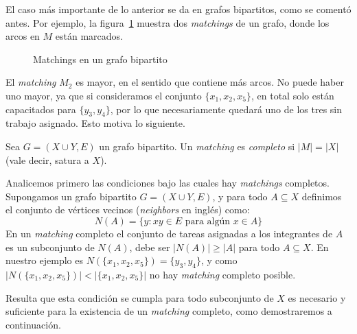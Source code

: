   El caso más importante de lo anterior se da en grafos bipartitos,
  como se comentó antes.%
  Por ejemplo,
  la figura~\ref{fig:matchings}
  muestra dos \emph{\foreignlanguage{english}{matchings}}
  de un grafo,
  donde los arcos en \(M\) están marcados.
  \begin{figure}[htbp]
    \centering
    \hspace*{4em}%
    \caption{Matchings en un grafo bipartito}
    \label{fig:matchings}
  \end{figure}
  El \emph{\foreignlanguage{english}{matching}} \(M_2\) es mayor,
  en el sentido que contiene más arcos.
  No puede haber uno mayor,
  ya que si consideramos el conjunto \(\{x_1, x_2, x_5\}\),
  en total solo están capacitados para \(\{y_3, y_4\}\),
  por lo que necesariamente quedará uno de los tres
  sin trabajo asignado.
  Esto motiva lo siguiente.
  \begin{definition}
    Sea \(G = (X \cup Y, E)\) un grafo bipartito.
    Un \emph{\foreignlanguage{english}{matching}}
    es \emph{completo} si \(\lvert M \rvert = \lvert X \rvert\)
    (vale decir,
     satura a \(X\)).
  \end{definition}

  Analicemos primero las condiciones
  bajo las cuales
  hay \emph{\foreignlanguage{english}{matchings}} completos.
  Supongamos un grafo bipartito \(G = (X \cup Y, E)\),
  y para todo \(A \subseteq X\) definimos
  el conjunto de vértices vecinos
  (\emph{\foreignlanguage{english}{neighbors}} en inglés) como:
  \begin{equation*}
    N(A) = \{y \colon x y \in E \text{\ para algún\ } x \in A\}
  \end{equation*}
  En un \emph{\foreignlanguage{english}{matching}} completo
  el conjunto de tareas asignadas a los integrantes de \(A\)
  es un subconjunto de \(N(A)\),
  debe ser \(\lvert N(A) \rvert \ge \lvert A \rvert\)
  para todo \(A \subseteq X\).
  En nuestro ejemplo
  es \(N(\{x_1, x_2, x_5\}) = \{y_3, y_4\}\),
  y como
    \(\lvert N(\{x_1, x_2, x_5\}) \rvert
	< \lvert \{x_1, x_2, x_5\} \rvert\)
  no hay \emph{\foreignlanguage{english}{matching}} completo
  posible.

  Resulta que esta condición se cumpla
  para todo subconjunto de \(X\) es necesario y suficiente
  para la existencia
  de un \emph{\foreignlanguage{english}{matching}} completo,
  como demostraremos a continuación.

